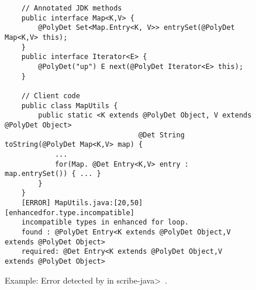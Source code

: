 %    

\begin{figure}
    \begin{verbatim}
    // Annotated JDK methods
    public interface Map<K,V> {
        @PolyDet Set<Map.Entry<K, V>> entrySet(@PolyDet Map<K,V> this);
    }
    public interface Iterator<E> {
        @PolyDet("up") E next(@PolyDet Iterator<E> this);
    }
    
    // Client code
    public class MapUtils {
        public static <K extends @PolyDet Object, V extends @PolyDet Object> 
                                @Det String toString(@PolyDet Map<K,V> map) {
            ...
            for(Map. @Det Entry<K,V> entry : map.entrySet()) { ... }
        }
    }
    [ERROR] MapUtils.java:[20,50] [enhancedfor.type.incompatible] 
    incompatible types in enhanced for loop.
    found : @PolyDet Entry<K extends @PolyDet Object,V extends @PolyDet Object>
    required: @Det Entry<K extends @PolyDet Object,V extends @PolyDet Object>
    \end{verbatim}
    \caption{Example: Error detected by \theDeterminismChecker in \<scribe-java>~\cite{nondex}.}
    \label{code-determinism}
\end{figure}


